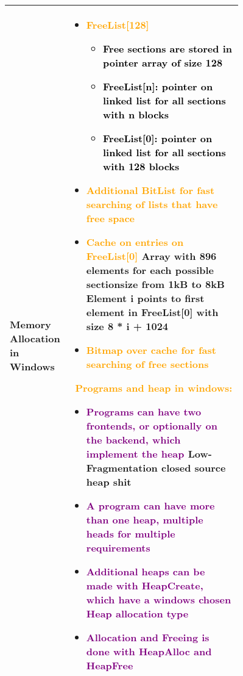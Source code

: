 \documentclass[main.tex,fontsize=8pt,paper=a4,paper=portrait,DIV=calc,]{scrartcl}
\begin{document}
\begin{table}[h!]
\begin{tabular}{|m{0,2\linewidth}|m{0.755\linewidth}|}
\hline
Memory Allocation in Windows & 
\vspace{2mm}
\begin{itemize}
  \item \textcolor{orange}{FreeList[128]}\newline
    \begin{itemize}
    \item \textcolor{black}{Free sections are stored in pointer array of size 128}
    \item \textcolor{black}{FreeList[n]: pointer on linked list for all sections with n blocks}
    \item \textcolor{black}{FreeList[0]: pointer on linked list for all sections with 128 blocks}
    \end{itemize} 
\item \textcolor{orange}{Additional BitList for fast searching of lists that have free space}
\item \textcolor{orange}{Cache on entries on FreeList[0]}\newline
  Array with 896 elements for each possible sectionsize from 1kB to 8kB\newline
  Element i points to first element in FreeList[0] with size 8 * i + 1024
\item \textcolor{orange}{Bitmap over cache for fast searching of free sections}
\vspace{-3mm}
\end{itemize} 
\, \newline
\textcolor{orange}{Programs and heap in windows:}\newline 
\begin{itemize}
\item \textcolor{purple}{Programs can have two frontends, or optionally on the backend, which implement the heap}\newline
  Low-Fragmentation closed source heap shit
\item \textcolor{purple}{A program can have more than one heap, multiple heads for multiple requirements}
\item \textcolor{purple}{Additional heaps can be made with \textbf{HeapCreate}, which have a windows chosen Heap allocation type}
\item \textcolor{purple}{Allocation and Freeing is done with \textbf{HeapAlloc} and \textbf{HeapFree}}
\vspace{-3mm}
\end{itemize} 
\\
\hline
\end{tabular}
\end{table}
\end{document}
